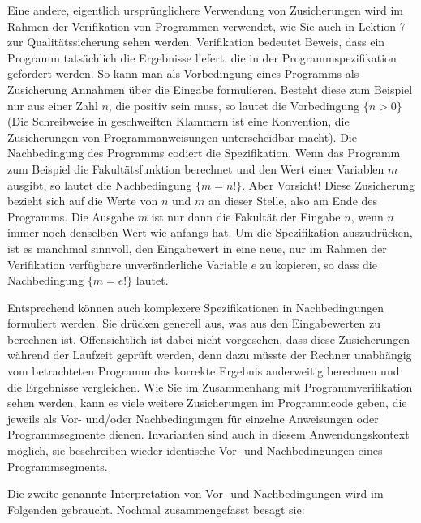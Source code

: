 Eine andere, eigentlich ursprünglichere Verwendung von Zusicherungen wird im Rahmen der Verifikation von Programmen verwendet, wie Sie auch in Lektion 7 zur Qualitätssicherung sehen werden. Verifikation bedeutet Beweis, dass ein Programm tatsächlich die Ergebnisse liefert, die in der Programmspezifikation gefordert werden. So kann man als Vorbedingung eines Programms als Zusicherung Annahmen über die Eingabe formulieren. Besteht diese zum Beispiel nur aus einer Zahl $n$, die positiv sein muss, so lautet die Vorbedingung $\{n>0\}$ (Die Schreibweise in geschweiften Klammern ist eine Konvention, die Zusicherungen von Programm\-anweisungen unter\-scheidbar macht).
Die Nachbedingung des Programms codiert die Spezifikation. Wenn das Programm zum Beispiel die Fakultätsfunktion berechnet und den Wert einer Variablen $m$ ausgibt, so lautet die Nachbedingung $\{m = n!\}$. Aber Vorsicht! Diese Zusicherung bezieht sich auf die Werte von $n$ und $m$ an dieser Stelle, also am Ende des Programms. Die Ausgabe $m$ ist nur dann die Fakultät der Eingabe $n$, wenn $n$ immer noch denselben Wert wie anfangs hat. Um die Spezifikation auszudrücken, ist es manchmal sinnvoll, den Eingabewert in eine neue, nur im Rahmen der Verifikation verfügbare unveränderliche Variable $e$ zu kopieren, so dass die Nachbedingung $\{m = e!\}$ lautet. 

Entsprechend können auch komplexere Spezifikationen in Nachbedingungen formuliert werden. Sie drücken generell aus, was aus den Eingabewerten zu berechnen ist. Offensichtlich ist dabei nicht vorgesehen, dass diese Zusicherungen während der Laufzeit geprüft werden, denn dazu müsste der Rechner unabhängig vom betrachteten Programm das korrekte Ergebnis anderweitig berechnen und die Ergebnisse vergleichen. Wie Sie im Zusammenhang mit Programmverifikation sehen werden, kann es viele weitere Zusicherungen im Programmcode geben, die jeweils als Vor- und/oder Nachbedingungen für einzelne Anweisungen oder Programmsegmente dienen.
Invarianten sind auch in diesem Anwendungskontext möglich, sie beschreiben wieder identische Vor- und Nachbedingungen eines Programmsegments.

Die zweite genannte Interpretation von Vor- und Nachbedingungen wird im Folgenden gebraucht. Nochmal zusammengefasst besagt sie:
\begin{center}
\begin{minipage}{.3\linewidth}

\vspace{2mm}


\vspace{2mm}

\end{minipage}
\end{center}

